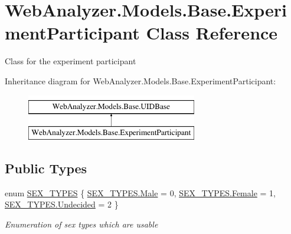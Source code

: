 \hypertarget{class_web_analyzer_1_1_models_1_1_base_1_1_experiment_participant}{}\section{Web\+Analyzer.\+Models.\+Base.\+Experiment\+Participant Class Reference}
\label{class_web_analyzer_1_1_models_1_1_base_1_1_experiment_participant}


Class for the experiment participant  


Inheritance diagram for Web\+Analyzer.\+Models.\+Base.\+Experiment\+Participant\+:\begin{figure}[H]
\begin{center}
\leavevmode
\includegraphics[height=2.000000cm]{class_web_analyzer_1_1_models_1_1_base_1_1_experiment_participant}
\end{center}
\end{figure}
\subsection*{Public Types}
\begin{DoxyCompactItemize}
\item 
enum \hyperlink{class_web_analyzer_1_1_models_1_1_base_1_1_experiment_participant_a38a0a0bc1d3ad083204da1de1fb93754}{S\+E\+X\+\_\+\+T\+Y\+P\+E\+S} \{ \hyperlink{class_web_analyzer_1_1_models_1_1_base_1_1_experiment_participant_a38a0a0bc1d3ad083204da1de1fb93754a63889cfb9d3cbe05d1bd2be5cc9953fd}{S\+E\+X\+\_\+\+T\+Y\+P\+E\+S.\+Male} = 0, 
\hyperlink{class_web_analyzer_1_1_models_1_1_base_1_1_experiment_participant_a38a0a0bc1d3ad083204da1de1fb93754ab719ce180ec7bd9641fece2f920f4817}{S\+E\+X\+\_\+\+T\+Y\+P\+E\+S.\+Female} = 1, 
\hyperlink{class_web_analyzer_1_1_models_1_1_base_1_1_experiment_participant_a38a0a0bc1d3ad083204da1de1fb93754aef203c53904d46dbafaa94497dd5a0e2}{S\+E\+X\+\_\+\+T\+Y\+P\+E\+S.\+Undecided} = 2
 \}\begin{DoxyCompactList}\small\item\em Enumeration of sex types which are usable \end{DoxyCompactList}
\end{DoxyCompactItemize}
